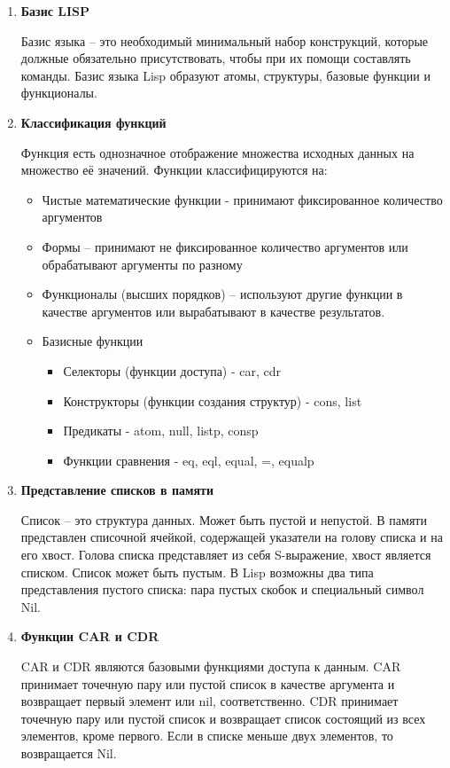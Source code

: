 \begin{enumerate}
\item \textbf{Базис LISP}

Базис языка – это необходимый минимальный набор конструкций, которые должные обязательно присутствовать, чтобы при их помощи составлять команды. Базис языка Lisp образуют атомы, структуры, базовые функции и функционалы. 

\item \textbf{Классификация функций}

Функция есть однозначное отображение множества исходных данных на множество её значений.
Функции классифицируются на:
\begin{itemize}
\item Чистые математические функции - принимают фиксированное количество аргументов
\item Формы – принимают не фиксированное количество аргументов или обрабатывают аргументы по разному
\item Функционалы (высших порядков) – используют другие функции в качестве аргументов или вырабатывают в качестве результатов.
\item Базисные функции
\begin{itemize}
\item Селекторы (функции доступа) - car, cdr
\item Конструкторы (функции создания структур) - cons, list
\item Предикаты - atom, null, listp, consp
\item Функции сравнения - eq, eql, equal, =, equalp
\end{itemize}
\end{itemize}

\item \textbf{Представление списков в памяти}

Список – это структура данных. Может быть пустой и непустой. В памяти представлен списочной ячейкой, содержащей указатели на голову списка и на его хвост. Голова списка представляет из себя S-выражение, хвост является списком. Список может быть пустым. В  Lisp возможны два типа представления пустого списка: пара пустых скобок и специальный символ Nil. 
\newpage
\item \textbf{Функции CAR и CDR}

CAR и CDR являются базовыми функциями доступа к данным. CAR принимает точечную пару или пустой список в качестве аргумента и возвращает первый элемент или nil, соответственно. CDR принимает точечную пару или пустой список и возвращает список состоящий из всех элементов, кроме первого. Если в списке меньше двух элементов, то возвращается Nil.
\end{enumerate}

